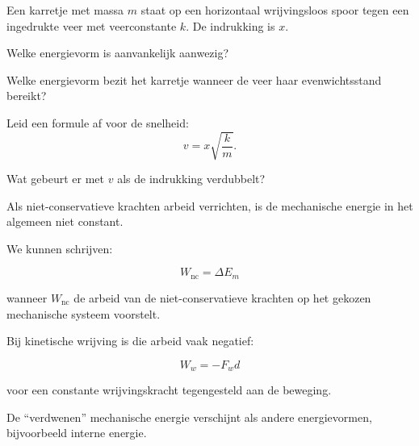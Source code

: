 \documentclass{ximera}
\begin{document}
\begin{oefening}{\oefU\ESS}

Een karretje met massa $m$ staat op een horizontaal wrijvingsloos spoor tegen
een ingedrukte veer met veerconstante $k$. De indrukking is $x$.

\begin{question}
Welke energievorm is aanvankelijk aanwezig?
\end{question}

\begin{question}
Welke energievorm bezit het karretje wanneer de veer haar evenwichtsstand
bereikt?
\end{question}

\begin{question}
Leid een formule af voor de snelheid:
\[
v=x\sqrt{\frac{k}{m}}.
\]
\end{question}

\begin{question}
Wat gebeurt er met $v$ als de indrukking verdubbelt?
\end{question}

\end{oefening}



Als niet-conservatieve krachten arbeid verrichten, is de mechanische energie
in het algemeen niet constant.

We kunnen schrijven:

\[
\boxed{
W_{\mathrm{nc}}=\Delta E_m
}
\]

wanneer $W_{\mathrm{nc}}$ de arbeid van de niet-conservatieve krachten op het
gekozen mechanische systeem voorstelt.

Bij kinetische wrijving is die arbeid vaak negatief:

\[
W_w=-F_w d
\]

voor een constante wrijvingskracht tegengesteld aan de beweging.

De ``verdwenen'' mechanische energie verschijnt als andere energievormen,
bijvoorbeeld interne energie.
\end{document}
